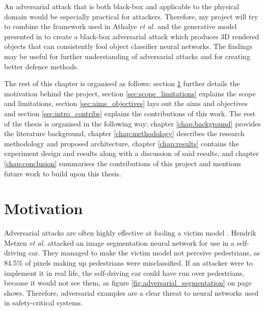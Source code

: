 An adversarial attack that is both black-box and applicable to the physical domain would be especially practical for attackers. Therefore, my project will try to combine the framework used in Athalye \textit{et al.} \cite{athalye} and the generative model presented in \cite{zheng_black_box_GAN} to create a black-box adversarial attack which produces 3D rendered objects that can consistently fool object classifier neural networks. The findings may be useful for further understanding of adversarial attacks and for creating better defence methods.

The rest of this chapter is organised as follows: section \ref{sec:motivation} further details the motivation behind the project, section \ref{sec:scope_limitations} explains the scope and limitations, section \ref{sec:aims_objectives} lays out the aims and objectives and section \ref{sec:intro_contribs} explains the contributions of this work. The rest of the thesis is organised in the following way: chapter \ref{chap:background} provides the literature background, chapter \ref{chap:methodology} describes the research methodology and proposed architecture, chapter \ref{chap:results} contains the experiment design and results along with a discussion of said results, and chapter \ref{chap:conclusion} summarises the contributions of this project and mentions future work to build upon this thesis.

\section{Motivation}
    \label{sec:motivation}
	
Adversarial attacks are often highly effective at fooling a victim model \cite{akhtar, silva_survey, dong2020benchmarking, robustart, fgsm}. Hendrik Metzen \textit{et al.} \cite{Metzen_2017_ICCV} attacked an image segmentation neural network for use in a self-driving car. They managed to make the victim model not perceive pedestrians, as 84.5\% of pixels making up pedestrians were misclassified. If an attacker were to implement it in real life, the self-driving car could have run over pedestrians, because it would not see them, as figure \ref{fig:adversarial_segmentation} on page \pageref{fig:adversarial_segmentation} shows. Therefore, adversarial examples are a clear threat to neural networks used in safety-critical systems.

